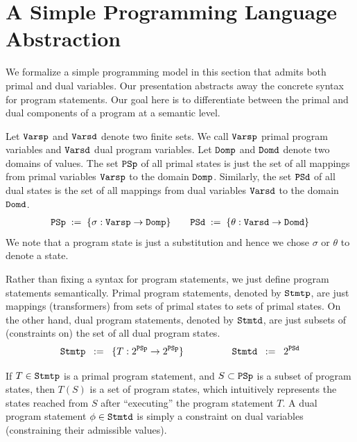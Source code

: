 \documentclass[preprint]{sig-alternate-05-2015}
\def\Vp{{\tt{Varsp}}}
\def\Vd{{\tt{Varsd}}}
\def\Stmtp{{\tt{Stmtp}}}
\def\Stmtd{{\tt{Stmtd}}}
\def\psp{{\tt{PSp}}}
\def\psd{{\tt{PSd}}}
\def\ds{{\mathit{\theta}}}   %
\def\domp{{\tt{Domp}}}
\def\domd{{\tt{Domd}}}
\begin{document}
\section{A Simple Programming Language Abstraction}
\label{sec:language}

We formalize a simple programming model in this section that
admits both primal and dual variables.
Our presentation abstracts away the concrete syntax for program statements.  
Our goal here is to differentiate between the primal and dual components of 
a program at a semantic level.

Let $\Vp$ and $\Vd$ denote two finite sets.
We call $\Vp$ primal program variables and 
$\Vd$ dual program variables.
Let $\domp$ and $\domd$ denote two domains of values.
The set $\psp$ of all primal states is
just the set of all mappings from primal 
variables $\Vp$ to the domain $\domp$.
Similarly, the set $\psd$ of all dual states is
the set of all mappings from dual 
variables $\Vd$ to the domain $\domd$.
\begin{eqnarray*}
  \psp \; := \;
  \{ \sigma: \Vp \rightarrow \domp \}
& \quad &
  \psd \; := \;
  \{ \ds: \Vd \rightarrow \domd \}
\end{eqnarray*}
We note that
a program state is just a substitution and hence
we chose $\sigma$ or $\ds$ to denote a state.

Rather than fixing a syntax for program statements,
we just define program statements semantically.
Primal program statements, denoted by $\Stmtp$,
are just mappings (transformers) from sets of primal states to 
sets of primal states.
On the other hand, dual program statements, denoted by $\Stmtd$,
are just subsets of (constraints on) the set of all dual program states.
\begin{eqnarray*}
 \Stmtp \;\; := \;\; \{ T: 2^\psp \rightarrow 2^\psp \}
& \qquad\qquad &
 \Stmtd \;\; := \;\; 2^{\psd}
\end{eqnarray*}

If $T\in\Stmtp$ is a primal program statement,
and $S\subset \psp$ is a subset of program states,
then $T(S)$ is a set of program states, which
intuitively represents the states reached from $S$
after ``executing'' the program statement $T$.
A dual program statement $\phi\in\Stmtd$ is simply a constraint
on dual variables (constraining their admissible values).
\end{document}

